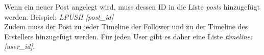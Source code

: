 \documentclass[
    a4paper
]{scrreprt}
\begin{document}
		Wenn ein neuer Post angelegt wird, muss dessen ID in die Liste \textit{posts} hinzugefügt werden. Beispiel: \textit{ LPUSH [post\_id]} \\
		Zudem muss der Post zu jeder Timeline der Follower und zu der Timeline des Erstellers hinzugefügt werden.
		Für jeden User gibt es daher eine Liste \textit{timeline:[user\_id]}.
	



\end{document}
